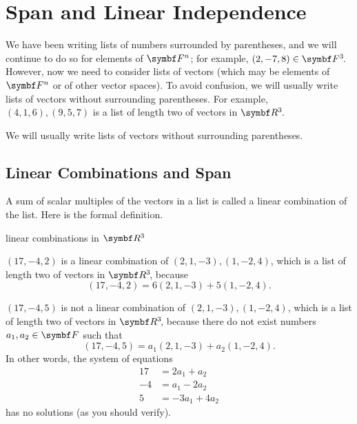 \section{Span and Linear Independence} \label{2spli}

We have been writing lists of numbers surrounded by parentheses, and we will continue to do so for elements of $\F{n}$; for example, $(2, -7, 8) \in \FF{3}$. However, now we need to consider lists of vectors (which may be elements of $\F{n}$ or of other vector spaces). To avoid confusion, we will usually write lists of vectors without surrounding parentheses. For example, $(4, 1, 6), (9,5, 7)$ is a list of length two of vectors in $\RR{3}$.

{We will usually write lists of vectors without surrounding parentheses.}

\subsection{Linear Combinations and Span}

A sum of scalar multiples of the vectors in a list is called a linear combination of the list. Here is the formal definition.


\begin{example}{linear combinations in\/ $\R{3}$}
\begin{Itemize}
\item
$(17, -4, 2)$ is a linear combination of $ (2, 1, -3), (1, -2, 4) $, which is a list of length two of vectors in $\RR3$, because
\[
(17, -4, 2) = 6(2, 1, -3) + 5(1, -2, 4).
\]
\vspace{-19bp}
\item
$(17, -4, 5)$ is not a linear combination of $ (2, 1, -3), (1, -2, 4)$, which is a list of length two of vectors in $\RR3$, because there do not exist numbers $a_1, a_2 \in \F{}$ such that
\[
(17, -4, 5) = a_1(2, 1, -3) + a_2(1, -2, 4).
\]
In other words, the system of equations
\begin{align*}
17 &= 2 a_1 + a_2 \\
-4 &= a_1 - 2a_2 \\
5 &= -3a_1 + 4a_2
\end{align*}
has no solutions (as you should verify).
\end{Itemize}
\vspace{-.15in}
\end{example}

